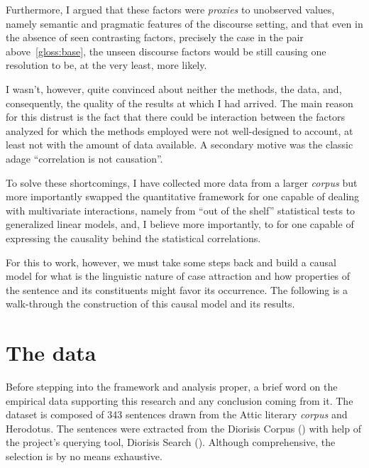 \documentclass[a4paper, 12pt, article]{memoir}
\begin{document}
Furthermore, I argued that these factors were \emph{proxies} to unobserved
values, namely semantic and pragmatic features of the discourse setting, and
that even in the absence of seen contrasting factors, precisely the case in the
pair above~\ref{gloss:base}, the unseen discourse factors would be still causing
one resolution to be, at the very least, more likely.

I wasn't, however, quite convinced about neither the methods, the data, and,
consequently, the quality of the results at which I had arrived.
The main reason for this distrust is the fact that there could be interaction
between the factors analyzed for which the methods employed were not well-designed
to account, at least not with the amount of data available.
A secondary motive was the classic adage ``correlation is not causation''.

To solve these shortcomings, I have collected more data from a larger
\emph{corpus} but more importantly swapped the quantitative framework for one
capable of dealing with multivariate interactions, namely from ``out of the
shelf'' statistical tests to generalized linear models, and, I believe more
importantly, to for one capable of expressing the causality behind the
statistical correlations.

For this to work, however, we must take some steps back and build a causal
model for what is the linguistic nature of case attraction and how properties of
the sentence and its constituents might favor its occurrence.
The following is a walk-through the construction of this causal model and its
results.

\chapter{The data} %

Before stepping into the framework and analysis proper, a brief word on the
empirical data supporting this research and any conclusion coming from it.
The dataset is composed of 343 sentences drawn from the Attic literary
\emph{corpus} and Herodotus.
The sentences were extracted from the Diorisis Corpus
(\cite{TheDiorisisAncientGreekCorpus,diorisis2021}) with help of the project's
querying tool, Diorisis Search (\cite{DiorisisSearch}).
Although comprehensive, the selection is by no means exhaustive.

%
\end{document}
